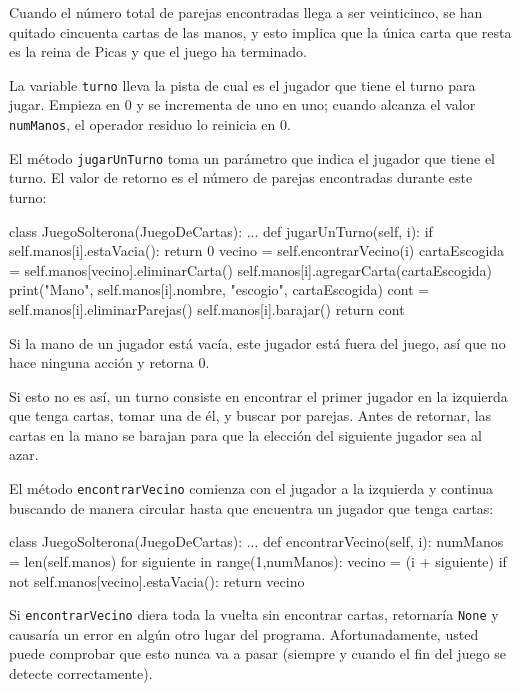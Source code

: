 Cuando el número total de parejas encontradas llega a ser veinticinco,
se han quitado cincuenta cartas de las manos, y esto implica que la
única carta que resta es la reina de Picas y que el juego ha terminado.

La variable \texttt{turno} lleva la pista de cual es el jugador que
tiene el turno para jugar. Empieza en 0 y se incrementa de uno en
uno; cuando alcanza el valor \texttt{numManos}, el operador residuo
lo reinicia en 0.

El método \texttt{jugarUnTurno} toma un parámetro que indica el jugador
que tiene el turno. El valor de retorno es el número de parejas encontradas
durante este turno:

\begin{pythoncode}
class JuegoSolterona(JuegoDeCartas):
  ...
  def jugarUnTurno(self, i):
    if self.manos[i].estaVacia():
      return 0
    vecino = self.encontrarVecino(i)
    cartaEscogida = self.manos[vecino].eliminarCarta()
    self.manos[i].agregarCarta(cartaEscogida)
    print("Mano", self.manos[i].nombre, 
          "escogio", cartaEscogida)
    cont = self.manos[i].eliminarParejas()
    self.manos[i].barajar()
    return cont
\end{pythoncode}
 Si la mano de un jugador está vacía, este jugador está fuera del
juego, así que no hace ninguna acción y retorna 0.

Si esto no es así, un turno consiste en encontrar el primer jugador
en la izquierda que tenga cartas, tomar una de él, y buscar por parejas.
Antes de retornar, las cartas en la mano se barajan para que la elección
del siguiente jugador sea al azar.

El método \texttt{encontrarVecino} comienza con el jugador a la izquierda
y continua buscando de manera circular hasta que encuentra un jugador
que tenga cartas:
\begin{pythoncode}
class JuegoSolterona(JuegoDeCartas):
  ...
  def encontrarVecino(self, i):
    numManos = len(self.manos)
    for siguiente in range(1,numManos):
      vecino = (i + siguiente) %
      if not self.manos[vecino].estaVacia():
        return vecino
\end{pythoncode}

Si \texttt{encontrarVecino} diera toda la vuelta sin encontrar cartas,
retornaría \texttt{None} y causaría un error en algún otro lugar del
programa. Afortunadamente, usted puede comprobar que esto nunca va
a pasar (siempre y cuando el fin del juego se detecte correctamente).

